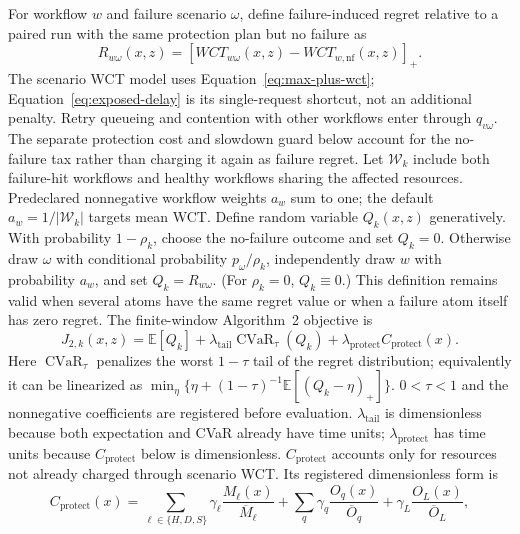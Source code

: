 For workflow $w$ and failure scenario $\omega$, define failure-induced regret
relative to a paired run with the same protection plan but no failure as
\begin{equation}
  R_{w\omega}(x,z)=
  \left[WCT_{w\omega}(x,z)-WCT_{w,\mathrm{nf}}(x,z)\right]_+.
  \label{eq:workflow-regret}
\end{equation}
The scenario WCT model uses Equation~\ref{eq:max-plus-wct};
Equation~\ref{eq:exposed-delay} is its single-request shortcut, not an
additional penalty.  Retry queueing and contention with other workflows enter
through $q_{v\omega}$.  The separate protection cost and slowdown guard below account for
the no-failure tax rather than charging it again as failure regret.  Let
$\mathcal W_k$ include both failure-hit workflows and healthy
workflows sharing the affected resources.  Predeclared nonnegative workflow
weights $a_w$ sum to one; the default $a_w=1/|\mathcal W_k|$ targets mean WCT.
Define random variable $Q_k(x,z)$ generatively.  With probability
$1-\rho_k$, choose the no-failure outcome and set $Q_k=0$.  Otherwise draw
$\omega$ with conditional probability $p_\omega/\rho_k$, independently draw
$w$ with probability $a_w$, and set $Q_k=R_{w\omega}$.  (For $\rho_k=0$,
$Q_k\equiv0$.)  This definition remains valid when several atoms have the same
regret value or when a failure atom itself has zero regret.  The finite-window
Algorithm~2 objective is
\begin{equation}
  J_{2,k}(x,z)=\mathbb E[Q_k]
    +\lambda_{\mathrm{tail}}\operatorname{CVaR}_{\tau}(Q_k)
    +\lambda_{\mathrm{protect}}C_{\mathrm{protect}}(x).
  \label{eq:objective}
\end{equation}
Here $\operatorname{CVaR}_{\tau}$ penalizes the worst $1-\tau$ tail of the
regret distribution; equivalently it can be linearized as
$\min_{\eta}\{\eta+(1-\tau)^{-1}\mathbb E[(Q_k-\eta)_+]\}$.
$0<\tau<1$ and the nonnegative coefficients are registered before evaluation.
$\lambda_{\mathrm{tail}}$ is dimensionless because both expectation and CVaR
already have time units; $\lambda_{\mathrm{protect}}$ has time units because
$C_{\mathrm{protect}}$ below is dimensionless.
$C_{\mathrm{protect}}$ accounts only for resources not already charged through
scenario WCT.  Its registered dimensionless form is
\begin{equation}
  C_{\mathrm{protect}}(x)=
    \sum_{\ell\in\{H,D,S\}}\gamma_\ell
      \frac{M_\ell(x)}{\overline M_\ell}
    +\sum_q\gamma_q\frac{O_q(x)}{\overline O_q}
    +\gamma_L\frac{O_L(x)}{\overline O_L},
  \label{eq:protection-cost}
\end{equation}
